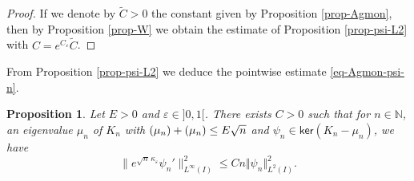 \documentclass[11pt]{article}
\numberwithin{equation}{section}
\theoremstyle{plain}
\newtheorem{proposition}[theorem]{Proposition}
\theoremstyle{definition}
\newcommand{\nr}[1]{\Vert #1\Vert}
\newcommand{\1}{\mathds 1}
\let\Re\relax
\DeclareMathOperator{\Re}{\mathsf{Re}\mkern2mu}
\let\Im\relax
\DeclareMathOperator{\Im}{\mathsf{Im}\mkern2mu}
\renewcommand{\ker}{\mathsf{ker}}
\newcommand{\N}{\mathbb{N}}
\let\e\varepsilon
\let\m\mu
\begin{document}
\begin{proof}
If we denote by $\tilde C > 0$ the constant given by Proposition \ref{prop-Agmon}, then by Proposition \ref{prop-W} we obtain the estimate of Proposition \ref{prop-psi-L2} with $C = e^{C_\e} \tilde C$.
\end{proof}

From Proposition \ref{prop-psi-L2} we deduce the pointwise estimate \eqref{eq-Agmon-psi-n}.

\begin{proposition} \label{prop-psi-Linf}
Let $E > 0$ and $\e \in{}]0,1[$. There exists $C > 0$ such that for $n \in \N$, an eigenvalue $\m_n$ of $K_n$ with $\Re(\m_n) + \Im(\m_n) \leq E \sqrt n$ and $\psi_n \in \ker(K_n-\m_n)$, we have
\[
\big\|e^{\sqrt n\,\kappa_\e} \psi_n'\big\|_{L^\infty(I)}^2 \leq C n \nr{\psi_n}_{L^2(I)}^2.
\]
\end{proposition}
\end{document}

